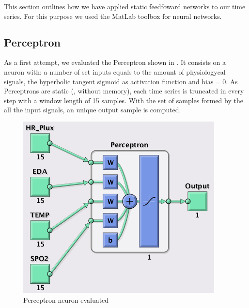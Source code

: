 \label{sec:application:feedforward}

This section outlines how we have applied static feedfoward networks to our time series. For this purpose we used the MatLab toolbox for neural networks.

\subsection{Perceptron}
\label{subsec:perceptronapplication}

As a first attempt, we evaluated the Perceptron shown in . 
It consists on a neuron with:
a number of set inputs equals to the amount of physiologycal signals, 
the hyperbolic tangent sigmoid as activation function
and $\text{bias}=0$. As Perceptrons are static (\ie, without memory), each time series is truncated in every step with a window length of 15 samples. 
With the set of samples formed by the all the input signals, an unique output sample is computed.
\begin{figure}[!ht]
\centering
\includegraphics[width=0.5\columnwidth]{images/results/perceptronnn}
\caption{Perceptron neuron evaluated}
\label{fig:perceptronnn}
\end{figure}

